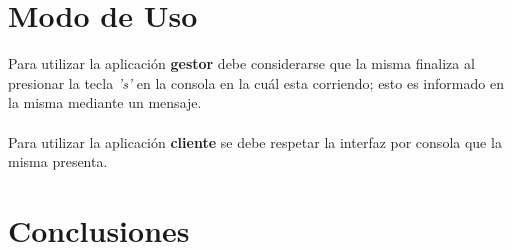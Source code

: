\documentclass[11pt]{article}
\begin{document}
\section{Modo de Uso}
Para utilizar la aplicaci\'on {\bf gestor} debe considerarse que la misma finaliza al presionar la tecla \textit{'s'} en la consola en la cu\'al esta corriendo; 
esto es informado en la misma mediante un mensaje. \\ \\
Para utilizar la aplicaci\'on {\bf cliente} se debe respetar la interfaz por consola que la misma presenta. \\

\newpage


\section{Conclusiones}
\end{document}
